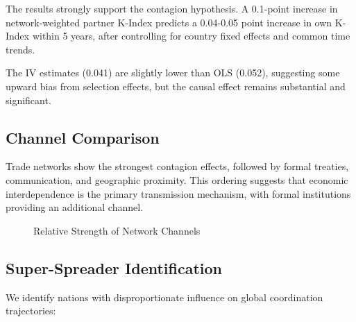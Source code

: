 \documentclass[12pt,a4paper]{article}
\begin{document}
The results strongly support the contagion hypothesis. A 0.1-point increase in network-weighted partner K-Index predicts a 0.04-0.05 point increase in own K-Index within 5 years, after controlling for country fixed effects and common time trends.

The IV estimates (0.041) are slightly lower than OLS (0.052), suggesting some upward bias from selection effects, but the causal effect remains substantial and significant.

\subsection{Channel Comparison}

Trade networks show the strongest contagion effects, followed by formal treaties, communication, and geographic proximity. This ordering suggests that economic interdependence is the primary transmission mechanism, with formal institutions providing an additional channel.

\begin{figure}[H]
\centering
{}
\caption{Relative Strength of Network Channels}
\label{fig:channels}
\end{figure}

\subsection{Super-Spreader Identification}

We identify nations with disproportionate influence on global coordination trajectories:
\end{document}
